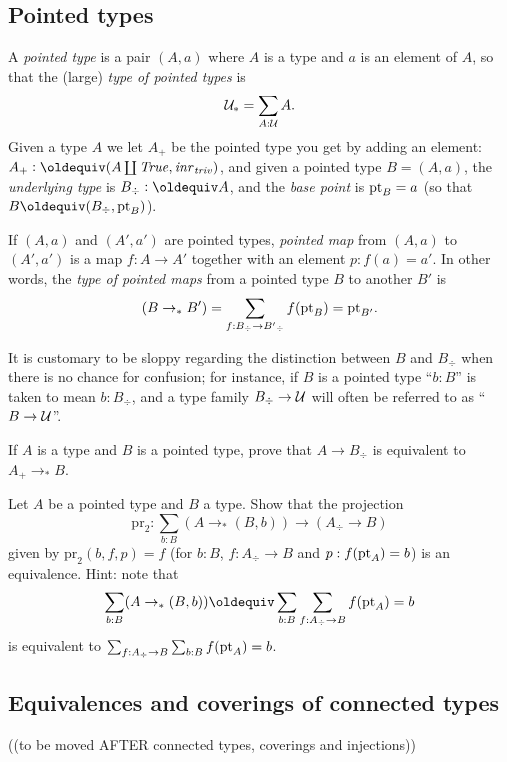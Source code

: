 \subsection{Pointed types}
\label{sec:poitedtypes}
\begin{definition}\label{def:pointedtypes}
  A \emph{pointed type} is a pair $(A,a)$ where $A$ is a type and $a$ is an element of $A$, so that the (large) \emph{type of pointed types} is
$$\mathcal{U}_*=\sum_{A:\mathcal{U}}A.$$
Given a type $A$ we let $A_+$ be the pointed type you get by adding an element: $A_+\defequi(A\coprod\true,\inr{\triv})$, and given a pointed type $B=(A,a)$, the \emph{underlying type} is $B_\div\defequi A$, and the \emph{base point} is ${\mathord{\mathrm{pt}}}_B=a$ (so that $B\oldequiv (B_\div,\pt_B)$).  

If $(A,a)$ and $(A',a')$ are pointed types,  \emph{pointed map} from  $(A,a)$ to $(A',a')$ is a map $f:A\to A'$ together with an element $p:f(a)=a'$.  In other words, the \emph{type of pointed maps} from a pointed type $B$ to another $B'$ is
$$(B\to_*B')=\sum_{f:B_\div\to B'{}_\div}f({\mathord{\mathrm{pt}}}_B)={\mathord{\mathrm{pt}}}_{B'}.$$
\end{definition}
\begin{remark}
  It is customary to be sloppy regarding the distinction between $B$ and $B_\div$  when there is no chance for confusion; for instance, if $B$ is a pointed type ``$b:B$'' is taken to mean $b:B_\div$, and a type family $B_\div\to\mathcal{U}$ will often be referred to as ``$B\to\mathcal{U}$''.
\end{remark}

\begin{xca}\label{xca:plusforgetadjoint}
  If $A$ is a type and $B$ is a pointed type, prove that $A\to B_\div$ is equivalent to $A_+\to_*B$.
\end{xca}
\begin{xca}\label{xca:freemaps}
  Let $A$ be a pointed type and $B$ a type.  Show that the projection  
$$\mathrm{pr}_2:\sum_{b:B}(A\to_*(B,b))\to (A_\div\to B)$$
given by $\mathrm{pr}_2(b,f,p)=f$ (for $b:B$, $f:A_\div\to B$ and $p:f({\mathord{\mathrm{pt}}}_A)=b$) is an equivalence.
Hint: note that 
$$\sum_{b:B}(A\to_*(B,b))\oldequiv \sum_{b:B}\sum_{f:A_\div\to B}f(\pt_A)=b$$ is equivalent to $\sum_{f:A_\div\to B}\sum_{b:B}f({\mathord{\mathrm{pt}}}_A)=b$.
\end{xca}



\subsection{Equivalences and coverings of connected types}
\label{sec:eqconntypes}((to be moved AFTER connected types, coverings and injections))

